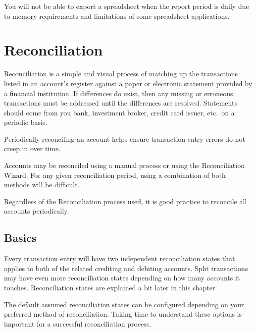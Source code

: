 \documentclass[letterpaper,12pt]{book}
\begin{document}
    You will not be able to export a spreadsheet when the report period is daily due to memory requirements and limitations
    of some spreadsheet applications.

    \chapter{Reconciliation}
    Reconciliation is a simple and visual process of matching up the transactions listed in an account's register against a
    paper or electronic statement provided by a financial institution.
    If differences do exist, then any missing or erroneous transactions must be addressed until the differences are resolved.
    Statements should come from you bank, investment broker, credit card issuer, etc.\ on a periodic basis.

    Periodically reconciling an account helps ensure transaction entry errors do not creep in over time.


    Accounts may be reconciled using a manual process or using the Reconciliation Wizard.
    For any given reconciliation period, using a combination of both methods will be difficult.

    Regardless of the Reconciliation process used, it is good practice to reconcile all accounts periodically.

    \section{Basics}
    Every transaction entry will have two independent reconciliation states that applies to both of the related
    crediting and debiting accounts.
    Split transactions may have even more reconciliation states depending on how many accounts it touches.
    Reconciliation states are explained a bit later in this chapter.

    The default assumed reconciliation states can be configured depending on your preferred method of reconciliation.
    Taking time to understand these options is important for a successful reconciliation process.

\end{document}
